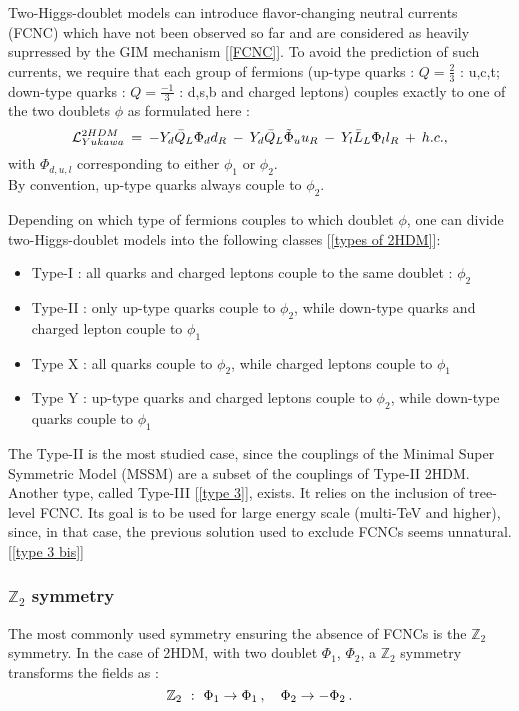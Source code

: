 \documentclass [12pt] {article}
\numberwithin{equation}{section} %
\numberwithin{figure}{section}   %
\newcommand{\Hquad}{\hspace{0.35em}}
\newcommand{\HHquad}{\hspace{0.2em}}
\begin{document}
Two-Higgs-doublet models can introduce flavor-changing neutral currents (FCNC) which have not been observed so far and are considered as heavily suprressed by the GIM mechanism [\ref{FCNC}]. To avoid the prediction of such currents, we require that each group of fermions (up-type quarks : $Q = \frac{2}{3}$ : u,c,t; down-type quarks : $Q = \frac{-1}{3}$ : d,s,b and charged leptons) couples exactly to one of the two doublets $\phi$ as formulated here :
\begin{equation}
    \mathcal{L}_{Yukawa}^{2HDM} \HHquad = \HHquad - Y_d \Bar{Q}_L \Phi_d d_R \HHquad - \HHquad Y_d \Bar{Q}_L \Tilde{\Phi}_u u_R \HHquad - \HHquad Y_l \Bar{L}_L \Phi_l l_R \HHquad + \HHquad h.c.,
\end{equation}
with $\Phi_{d, u, l}$ corresponding to either $\phi_1$ or $\phi_2$.\\
By convention, up-type quarks always couple to $\phi_2$.

Depending on which type of fermions couples to which doublet 
$\phi$, one can divide two-Higgs-doublet models into the following classes [\ref{types of 2HDM}]: 
\begin{itemize}
    \item Type-I : all quarks and charged leptons couple to the same doublet : $\phi_2$
    \item Type-II : only up-type quarks couple to $\phi_2$, while down-type quarks and charged lepton couple to $\phi_1$
    \item Type X : all quarks couple to $\phi_2$, while charged leptons couple to $\phi_1$
    \item  Type Y : up-type quarks and charged leptons couple to $\phi_2$, while down-type quarks couple to $\phi_1$
\end{itemize}
The Type-II is the most studied case, since the couplings of the Minimal Super Symmetric Model (MSSM) are a subset of the couplings of Type-II 2HDM.\\
Another type, called Type-III [\ref{type 3}], exists. It relies on the inclusion of tree-level FCNC. Its goal is to be used for large energy scale (multi-TeV and higher), since, in that case, the previous solution used to exclude FCNCs seems unnatural. [\ref{type 3 bis}]

\subsubsection*{$\mathbb{Z}_2$ symmetry}

The most commonly used symmetry ensuring the absence of FCNCs is the $\mathbb{Z}_2$ symmetry. In the case of 2HDM, with two doublet $\Phi_1$, $\Phi_2$, a $\mathbb{Z}_2$ symmetry transforms the fields as :
\begin{equation}
    \mathbb{Z}_2 \Hquad : \Hquad \Phi_1 \rightarrow \Phi_1 \HHquad, \quad \Phi_2 \rightarrow -\Phi_2 \HHquad.
\end{equation}
\end{document}
